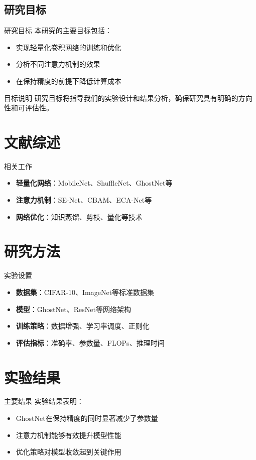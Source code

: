 \documentclass[10pt]{beamer}
\begin{document}
\subsection{研究目标}
\begin{frame}{研究目标}
本研究的主要目标包括：
\begin{itemize}
\item 实现轻量化卷积网络的训练和优化
\item 分析不同注意力机制的效果
\item 在保持精度的前提下降低计算成本
\end{itemize}

\begin{block}{目标说明}
研究目标将指导我们的实验设计和结果分析，确保研究具有明确的方向性和可评估性。
\end{block}
\end{frame}

\section{文献综述}
\begin{frame}{相关工作}
\begin{itemize}
\item \textbf{轻量化网络}：MobileNet、ShuffleNet、GhostNet等
\item \textbf{注意力机制}：SE-Net、CBAM、ECA-Net等
\item \textbf{网络优化}：知识蒸馏、剪枝、量化等技术
\end{itemize}
\end{frame}

\section{研究方法}
\begin{frame}{实验设置}
\begin{itemize}
\item \textbf{数据集}：CIFAR-10、ImageNet等标准数据集
\item \textbf{模型}：GhostNet、ResNet等网络架构
\item \textbf{训练策略}：数据增强、学习率调度、正则化
\item \textbf{评估指标}：准确率、参数量、FLOPs、推理时间
\end{itemize}
\end{frame}

\section{实验结果}
\begin{frame}{主要结果}
实验结果表明：
\begin{itemize}
\item GhostNet在保持精度的同时显著减少了参数量
\item 注意力机制能够有效提升模型性能
\item 优化策略对模型收敛起到关键作用
\end{itemize}
\end{frame}
\end{document}
